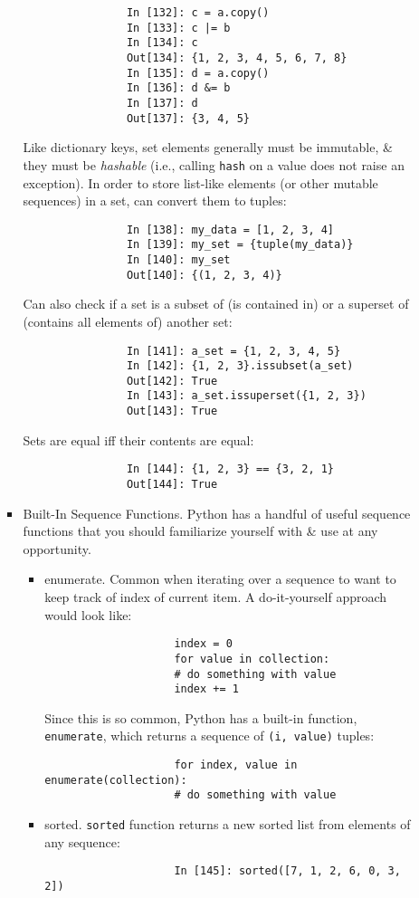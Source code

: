 \documentclass{article}
\begin{document}
\begin{itemize}
\begin{itemize}
\begin{itemize}
\begin{verbatim}
				In [132]: c = a.copy()
				In [133]: c |= b
				In [134]: c
				Out[134]: {1, 2, 3, 4, 5, 6, 7, 8}
				In [135]: d = a.copy()
				In [136]: d &= b
				In [137]: d
				Out[137]: {3, 4, 5}
			\end{verbatim}
			Like dictionary keys, set elements generally must be immutable, \& they must be {\it hashable} (i.e., calling {\tt hash} on a value does not raise an exception). In order to store list-like elements (or other mutable sequences) in a set, can convert them to tuples:
			\begin{verbatim}
				In [138]: my_data = [1, 2, 3, 4]
				In [139]: my_set = {tuple(my_data)}
				In [140]: my_set
				Out[140]: {(1, 2, 3, 4)}
			\end{verbatim}
			Can also check if a set is a subset of (is contained in) or a superset of (contains all elements of) another set:
			\begin{verbatim}
				In [141]: a_set = {1, 2, 3, 4, 5}
				In [142]: {1, 2, 3}.issubset(a_set)
				Out[142]: True
				In [143]: a_set.issuperset({1, 2, 3})
				Out[143]: True
			\end{verbatim}
			Sets are equal iff their contents are equal:
			\begin{verbatim}
				In [144]: {1, 2, 3} == {3, 2, 1}
				Out[144]: True
			\end{verbatim}
			\item {\sf Built-In Sequence Functions.} Python has a handful of useful sequence functions that you should familiarize yourself with \& use at any opportunity.
			\begin{itemize}
				\item {\sf enumerate.} Common when iterating over a sequence to want to keep track of index of current item. A do-it-yourself approach would look like:
				\begin{verbatim}
					index = 0
					for value in collection:
					# do something with value
					index += 1
				\end{verbatim}
				Since this is so common, Python has a built-in function, {\tt enumerate}, which returns a sequence of {\tt(i, value)} tuples:
				\begin{verbatim}
					for index, value in enumerate(collection):
					# do something with value
				\end{verbatim}
				\item {\sf sorted.} {\tt sorted} function returns a new sorted list from elements of any sequence:
				\begin{verbatim}
					In [145]: sorted([7, 1, 2, 6, 0, 3, 2])

\end{verbatim}
\end{itemize}
\end{itemize}
\end{itemize}
\end{itemize}
\end{document}
